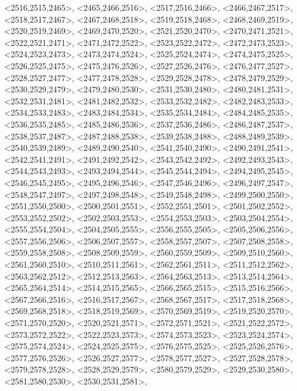 \documentclass[a4paper,10pt]{article}
\begin{document}
\begin{eulernotebook}
\begin{euleroutput}
  <2516,2515,2465>,
  <2465,2466,2516>,
  <2517,2516,2466>,
  <2466,2467,2517>,
  <2518,2517,2467>,
  <2467,2468,2518>,
  <2519,2518,2468>,
  <2468,2469,2519>,
  <2520,2519,2469>,
  <2469,2470,2520>,
  <2521,2520,2470>,
  <2470,2471,2521>,
  <2522,2521,2471>,
  <2471,2472,2522>,
  <2523,2522,2472>,
  <2472,2473,2523>,
  <2524,2523,2473>,
  <2473,2474,2524>,
  <2525,2524,2474>,
  <2474,2475,2525>,
  <2526,2525,2475>,
  <2475,2476,2526>,
  <2527,2526,2476>,
  <2476,2477,2527>,
  <2528,2527,2477>,
  <2477,2478,2528>,
  <2529,2528,2478>,
  <2478,2479,2529>,
  <2530,2529,2479>,
  <2479,2480,2530>,
  <2531,2530,2480>,
  <2480,2481,2531>,
  <2532,2531,2481>,
  <2481,2482,2532>,
  <2533,2532,2482>,
  <2482,2483,2533>,
  <2534,2533,2483>,
  <2483,2484,2534>,
  <2535,2534,2484>,
  <2484,2485,2535>,
  <2536,2535,2485>,
  <2485,2486,2536>,
  <2537,2536,2486>,
  <2486,2487,2537>,
  <2538,2537,2487>,
  <2487,2488,2538>,
  <2539,2538,2488>,
  <2488,2489,2539>,
  <2540,2539,2489>,
  <2489,2490,2540>,
  <2541,2540,2490>,
  <2490,2491,2541>,
  <2542,2541,2491>,
  <2491,2492,2542>,
  <2543,2542,2492>,
  <2492,2493,2543>,
  <2544,2543,2493>,
  <2493,2494,2544>,
  <2545,2544,2494>,
  <2494,2495,2545>,
  <2546,2545,2495>,
  <2495,2496,2546>,
  <2547,2546,2496>,
  <2496,2497,2547>,
  <2548,2547,2497>,
  <2497,2498,2548>,
  <2549,2548,2498>,
  <2499,2500,2550>,
  <2551,2550,2500>,
  <2500,2501,2551>,
  <2552,2551,2501>,
  <2501,2502,2552>,
  <2553,2552,2502>,
  <2502,2503,2553>,
  <2554,2553,2503>,
  <2503,2504,2554>,
  <2555,2554,2504>,
  <2504,2505,2555>,
  <2556,2555,2505>,
  <2505,2506,2556>,
  <2557,2556,2506>,
  <2506,2507,2557>,
  <2558,2557,2507>,
  <2507,2508,2558>,
  <2559,2558,2508>,
  <2508,2509,2559>,
  <2560,2559,2509>,
  <2509,2510,2560>,
  <2561,2560,2510>,
  <2510,2511,2561>,
  <2562,2561,2511>,
  <2511,2512,2562>,
  <2563,2562,2512>,
  <2512,2513,2563>,
  <2564,2563,2513>,
  <2513,2514,2564>,
  <2565,2564,2514>,
  <2514,2515,2565>,
  <2566,2565,2515>,
  <2515,2516,2566>,
  <2567,2566,2516>,
  <2516,2517,2567>,
  <2568,2567,2517>,
  <2517,2518,2568>,
  <2569,2568,2518>,
  <2518,2519,2569>,
  <2570,2569,2519>,
  <2519,2520,2570>,
  <2571,2570,2520>,
  <2520,2521,2571>,
  <2572,2571,2521>,
  <2521,2522,2572>,
  <2573,2572,2522>,
  <2522,2523,2573>,
  <2574,2573,2523>,
  <2523,2524,2574>,
  <2575,2574,2524>,
  <2524,2525,2575>,
  <2576,2575,2525>,
  <2525,2526,2576>,
  <2577,2576,2526>,
  <2526,2527,2577>,
  <2578,2577,2527>,
  <2527,2528,2578>,
  <2579,2578,2528>,
  <2528,2529,2579>,
  <2580,2579,2529>,
  <2529,2530,2580>,
  <2581,2580,2530>,
  <2530,2531,2581>,

\end{euleroutput}
\end{eulernotebook}
\end{document}
